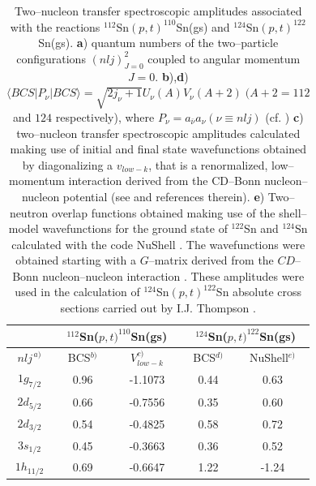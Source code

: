  \begin{table}[h!]
 {\begin{tabular}{|c|c|c|c|c|}
 \cline{2-5} 
 \multicolumn{1}{c|}{ }& \multicolumn{2}{|c|}{ $^{112}$Sn($p,t)^{110}$Sn(gs)}&\multicolumn{2}{|c|}{$^{124}$Sn($p,t)^{122}$Sn(gs)} \\
 \hline
 $nlj^{\,a)}$ & BCS$^{b)}$ & $V_{low-k}^{c)}$ & BCS$^{d)}$& NuShell$^{e)}$  \\
 \hline
 $1g_{7/2}$ & 0.96 &-1.1073 & 0.44 & 0.63  \\
 $2d_{5/2}$ & 0.66 & -0.7556& 0.35 & 0.60  \\
 $2d_{3/2}$ & 0.54 &  -0.4825& 0.58 & 0.72  \\
 $3s_{1/2}$ & 0.45 &  -0.3663&  0.36 & 0.52  \\
 $1h_{11/2}$ & 0.69 & -0.6647 & 1.22 & -1.24  \\
 \hline 
 \end{tabular}}
 \caption{Two--nucleon transfer spectroscopic amplitudes associated with the reactions $^{112}$Sn$(p,t)^{110}$Sn(gs) and $^{124}$Sn$(p,t)^{122}$Sn(gs). \textbf{a}) quantum numbers of the two--particle configurations $(nlj)^2_{J=0}$ coupled to angular momentum $J=0$. \textbf{b}),\textbf{d}) $\langle BCS|P_\nu|BCS\rangle=\sqrt{2j_\nu+1}U_\nu(A) V_\nu(A+2)\;(A+2=112$ and $ 124$ respectively), where $P_\nu=a_{\bar\nu}a_\nu (\nu\equiv nlj)$ (cf. \cite{Potel:11,Potel:13,Potel:13b}) \textbf{c}) two--nucleon transfer spectroscopic amplitudes calculated making use of initial and final state wavefunctions obtained by diagonalizing a $v_{low-k}$, that is a renormalized, low--momentum interaction derived from the CD--Bonn nucleon--nucleon potential (see \cite{Guazzoni:06} and references therein). \textbf{e}) Two--neutron overlap functions obtained making use of the shell--model wavefunctions for the ground state of $^{122}$Sn and $^{124}$Sn calculated with the code NuShell \citep{Brown:07}. The wavefunctions were obtained starting with a $G$--matrix derived from the $CD$--Bonn nucleon--nucleon interaction \cite{Machleidt:96}. These amplitudes were used in the calculation of $^{124}$Sn$(p,t)^{122}$Sn absolute cross sections carried out by I.J. Thompson \citep{Thompson:13}.}\label{tab1D1}
 \end{table}
